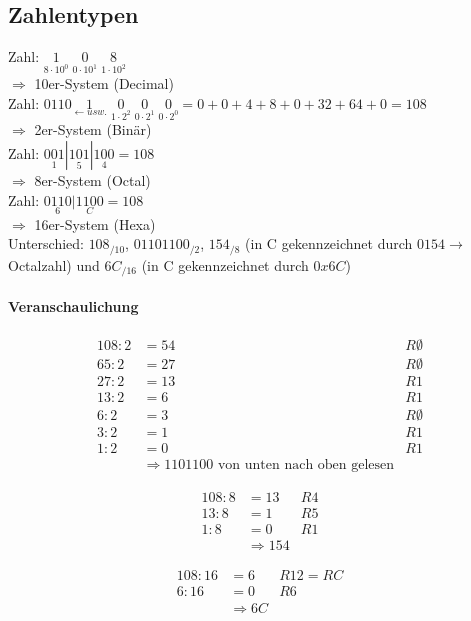 \subsection{Zahlentypen}
Zahl: $\underset{8\cdot 10^0}{1} \; \underset{0 \cdot 10^1}{0} \;\underset{1\cdot 10^2}{8}$\\
$\Rightarrow$ 10er-System (Decimal)\\
Zahl: $0110\underset{\leftarrow usw.}{1}\;\underset{1\cdot 2^2}{0}\;\underset{0\cdot 2^1}{0}\;\underset{0\cdot 2^0}{0} = 0 + 0 + 4+8+0+32+64+0 =108$\\
$\Rightarrow$ 2er-System (Binär)\\
Zahl: $\underset{1}{001}|\underset{5}{101}|\underset{4}{100}=108$\\
$\Rightarrow$ 8er-System (Octal)\\
Zahl: $\underset{6}{0110}|\underset{C}{1100}=108$\\
$\Rightarrow$ 16er-System (Hexa)\\
Unterschied: $108_{/10}$, $01101100_{/2}$, $154_{/8}$ (in C gekennzeichnet durch $0154\rightarrow$ Octalzahl) und $6C_{/16}$ (in C gekennzeichnet durch $0x6C$)

\paragraph{Veranschaulichung}
\begin{align*}
108:2&=54 &R \emptyset\\
65:2 &= 27 &R \emptyset\\
27:2&= 13 &R 1\\
13:2 &= 6 &R 1\\
6:2 &=3 &R \emptyset\\
3:2 &= 1 &R 1\\
1:2&= 0 &R 1\\
&\Rightarrow 1101100 \text{ von unten nach oben gelesen}&
\end{align*}

\begin{align*}
108:8 &= 13 &R4\\
13:8 &= 1 &R5\\
1:8 &= 0 &R1\\
&\Rightarrow 154&
\end{align*}

\begin{align*}
108: 16 &= 6 &R12 = RC\\
6:16 &= 0 &R6\\
&\Rightarrow 6C&
\end{align*}

